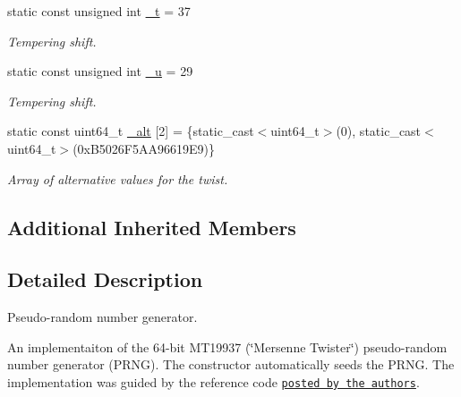 \begin{DoxyCompactItemize}
\mbox{\label{classvarfiles_1_1_generate_m_t_a1ee601d010446762cfc1ad6c98d6673f}} 
static const unsigned int \hyperlink{classvarfiles_1_1_generate_m_t_a1ee601d010446762cfc1ad6c98d6673f}{\+\_\+t} = 37
\begin{DoxyCompactList}\small\item\em Tempering shift. \end{DoxyCompactList}\item 
\mbox{\label{classvarfiles_1_1_generate_m_t_a115d257a43adaf460b41c8725f016abd}} 
static const unsigned int \hyperlink{classvarfiles_1_1_generate_m_t_a115d257a43adaf460b41c8725f016abd}{\+\_\+u} = 29
\begin{DoxyCompactList}\small\item\em Tempering shift. \end{DoxyCompactList}\item 
\mbox{\label{classvarfiles_1_1_generate_m_t_adf7067ae1e83dd2129650643b5930684}} 
static const uint64\+\_\+t \hyperlink{classvarfiles_1_1_generate_m_t_adf7067ae1e83dd2129650643b5930684}{\+\_\+alt} \mbox{[}2\mbox{]} = \{static\+\_\+cast$<$uint64\+\_\+t$>$(0), static\+\_\+cast$<$uint64\+\_\+t$>$(0x\+B5026\+F5\+A\+A96619\+E9)\}
\begin{DoxyCompactList}\small\item\em Array of alternative values for the twist. \end{DoxyCompactList}\end{DoxyCompactItemize}
\subsection*{Additional Inherited Members}


\subsection{Detailed Description}
Pseudo-\/random number generator. 

An implementaiton of the 64-\/bit M\+T19937 (\char`\"{}\+Mersenne Twister\char`\"{}) \cite{matsumoto98a} pseudo-\/random number generator (P\+R\+NG). The constructor automatically seeds the P\+R\+NG. The implementation was guided by the reference code \href{http://www.math.sci.hiroshima-u.ac.jp/~m-mat/MT/emt64.html}{\tt posted by the authors}. 


